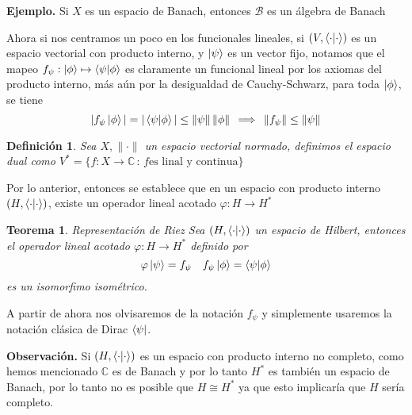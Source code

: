 \documentclass[letterpaper]{book}
\newtheorem{teorema}{Teorema}[section]
\newtheorem{def.}{Definici\'on}[section]
\newcommand{\eje}{{\noindent \sc \textbf{Ejemplo. }}}
\newcommand{\obs}{{\noindent \sc \textbf{Observación. }}}
\newcommand{\co}{\ensuremath{\mathbb C }}
\begin{document}
\eje Si \(X\) es un espacio de Banach, entonces \(\mathcal{B}\) es un álgebra de Banach

Ahora si  nos centramos un poco en los funcionales lineales, si \((V,\braket{\cdot|\cdot})\) es un espacio vectorial con producto interno, y \(\ket{\psi}\) es un vector fijo, notamos que el mapeo \(f_{\psi}:\ket{\phi}\mapsto\braket{\psi|\phi}\) es claramente un funcional lineal por los axiomas del producto interno, más aún por la desigualdad de Cauchy-Schwarz, para toda \(\ket{\phi}\), se tiene
\[
|f_{\psi}\ket{\phi}|=|\braket{\psi|\phi}|\leq\|\psi\|\,\|\phi\|\,\implies\,\|f_{\psi}\|\leq\|\psi\|
\]
\begin{def.}
Sea \(X,\|\cdot\|\) un espacio vectorial normado, definimos el espacio dual como \(V^*=\{f:X\rightarrow\co\,:\,f \text{es linal y continua}\}\)
\end{def.}

Por lo anterior, entonces se establece que en un espacio con producto interno \((H,\braket{\cdot|\cdot})\), existe un operador lineal acotado \(\varphi:H\rightarrow H^*\)

\begin{teorema}{Representación de Riez}
  Sea \((H,\braket{\cdot|\cdot})\) un espacio de Hilbert, entonces el operador lineal acotado \(\varphi:H\rightarrow H^*\) definido por
  \[
  \varphi\ket{\psi}=f_{\psi}\quad f_{\psi}\ket{\phi}=\braket{\psi|\phi}
  \]
  es un \emph{isomorfimo isométrico}.
  \end{teorema}
A partir de ahora nos olvisaremos de la notación \(f_{\psi}\) y simplemente usaremos la notación clásica de Dirac \(\bra{\psi}\).

\obs Si \((H,\braket{\cdot|\cdot})\) es un espacio con producto interno no completo, como hemos mencionado \(\co\) es de Banach y por lo tanto \(H^{*}\) es también un espacio de Banach, por lo tanto no es posible que \(H\cong H^{*}\) ya que esto implicaría que \(H\) sería completo.
\end{document}
